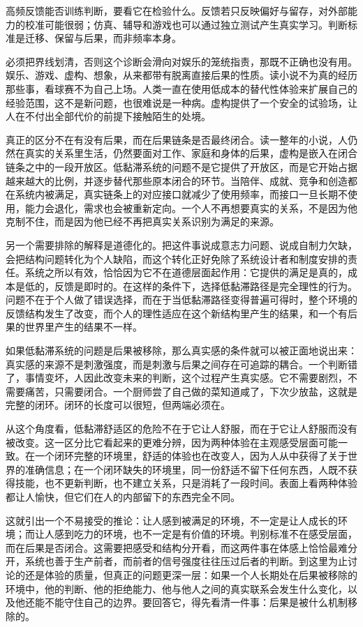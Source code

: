 高频反馈能否训练判断，要看它在检验什么。反馈若只反映偏好与留存，对外部能力的校准可能很弱；仿真、辅导和游戏也可以通过独立测试产生真实学习。判断标准是迁移、保留与后果，而非频率本身。


必须把界线划清，否则这个诊断会滑向对娱乐的笼统指责，那既不正确也没有用。娱乐、游戏、虚构、想象，从来都带有脱离直接后果的性质。读小说不为真的经历那些事，看球赛不为自己上场。人类一直在使用低成本的替代性体验来扩展自己的经验范围，这不是新问题，也很难说是一种病。虚构提供了一个安全的试验场，让人在不付出全部代价的前提下接触陌生的处境。

真正的区分不在有没有后果，而在后果链条是否最终闭合。读一整年的小说，人仍然在真实的关系里生活，仍然要面对工作、家庭和身体的后果，虚构是嵌入在闭合链条之中的一段开放区。低黏滞系统的问题不是它提供了开放区，而是它开始占据越来越大的比例，并逐步替代那些原本闭合的环节。当陪伴、成就、竞争和创造都在系统内被满足，真实链条上的对应接口就减少了使用频率，而接口一旦长期不使用，能力会退化，需求也会被重新定向。一个人不再想要真实的关系，不是因为他克制不住，而是因为他已经不再把真实关系识别为满足的来源。

另一个需要排除的解释是道德化的。把这件事说成意志力问题、说成自制力欠缺，会把结构问题转化为个人缺陷，而这个转化正好免除了系统设计者和制度安排的责任。系统之所以有效，恰恰因为它不在道德层面起作用：它提供的满足是真的，成本是低的，反馈是即时的。在这样的条件下，选择低黏滞路径是完全理性的行为。问题不在于个人做了错误选择，而在于当低黏滞路径变得普遍可得时，整个环境的反馈结构发生了改变，而个人的理性适应在这个新结构里产生的结果，和一个有后果的世界里产生的结果不一样。


如果低黏滞系统的问题是后果被移除，那么真实感的条件就可以被正面地说出来：真实感的来源不是刺激强度，而是刺激与后果之间存在可追踪的耦合。一个判断错了，事情变坏，人因此改变未来的判断，这个过程产生真实感。它不需要剧烈，不需要痛苦，只需要闭合。一个厨师尝了自己做的菜知道咸了，下次少放盐，这就是完整的闭环。闭环的长度可以很短，但两端必须在。

从这个角度看，低黏滞舒适区的危险不在于它让人舒服，而在于它让人舒服而没有被改变。这一区分比它看起来的更难分辨，因为两种体验在主观感受层面可能一致。在一个闭环完整的环境里，舒适的体验也在改变人，因为人从中获得了关于世界的准确信息；在一个闭环缺失的环境里，同一份舒适不留下任何东西，人既不获得技能，也不更新判断，也不建立关系，只是消耗了一段时间。表面上看两种体验都让人愉快，但它们在人的内部留下的东西完全不同。

这就引出一个不易接受的推论：让人感到被满足的环境，不一定是让人成长的环境；而让人感到吃力的环境，也不一定是有价值的环境。判别标准不在感受层面，而在后果是否闭合。这需要把感受和结构分开看，而这两件事在体感上恰恰最难分开，系统也善于生产前者，而前者的信号强度往往压过后者的判断。到这里为止讨论的还是体验的质量，但真正的问题更深一层：如果一个人长期处在后果被移除的环境中，他的判断、他的拒绝能力、他与他人之间的真实联系会发生什么变化，以及他还能不能守住自己的边界。要回答它，得先看清一件事：后果是被什么机制移除的。

